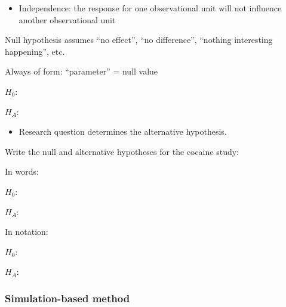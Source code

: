 \documentclass[
]{report}
\providecommand{\tightlist}{%
  \setlength{\itemsep}{0pt}\setlength{\parskip}{0pt}}
\newcommand{\rgi}{\hspace{24pt}}  %
\begin{document}
\begin{itemize}
\tightlist
\item
  Independence: the response for one observational unit will not influence another observational unit
\end{itemize}

Null hypothesis assumes ``no effect'', ``no difference'', ``nothing interesting happening'', etc.

\rgi Always of form: ``parameter'' = null value

\(H_0:\)

\vspace{0.3in}

\(H_A:\)

\vspace{0.3in}

\begin{itemize}
\tightlist
\item
  Research question determines the alternative hypothesis.
\end{itemize}

Write the null and alternative hypotheses for the cocaine study:

In words:

\(H_0:\)

\vspace{0.5in}

\(H_A:\)

\vspace{0.5in}

In notation:

\(H_0:\)

\vspace{0.2in}

\(H_A:\)

\vspace{0.2in}

\hypertarget{simulation-based-method-2}{%
\subsubsection*{Simulation-based method}\label{simulation-based-method-2}}
\end{document}
